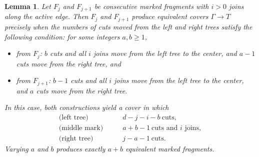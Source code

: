 \documentclass[11pt,reqno]{amsart}
\newtheorem{lemma}[theorem]{Lemma}
\theoremstyle{definition}
\begin{document}
\begin{lemma}\label{coversbecomesame}
Let $F_j$ and $F_{j+1}$ be consecutive marked fragments with $i>0$ joins along 
the active edge. Then $F_j$ and $F_{j+1}$ produce equivalent covers 
$\Gamma \to T$ precisely when the numbers of cuts moved from the left and 
right trees satisfy the following condition: for some integers $a,b \ge 1$,
\begin{itemize}
    \item from $F_j$: $b$ cuts and all $i$ joins move from the left tree to the center,
    and $a-1$ cuts move from the right tree, and
    \item from $F_{j+1}$: $b-1$ cuts and all $i$ joins move from the left tree
    to the center, and $a$ cuts move from the right tree.
\end{itemize}
In this case, both constructions yield a cover in which
\[
\begin{aligned}
\text{(left tree)} &\qquad d - j - i - b \ \text{cuts},\\
\text{(middle mark)} &\qquad a + b - 1 \ \text{cuts and } i \text{ joins},\\
\text{(right tree)} &\qquad j - a - 1 \ \text{cuts}.
\end{aligned}
\]
Varying $a$ and $b$ produces exactly $a+b$ equivalent marked fragments.
\end{lemma}
\end{document}
